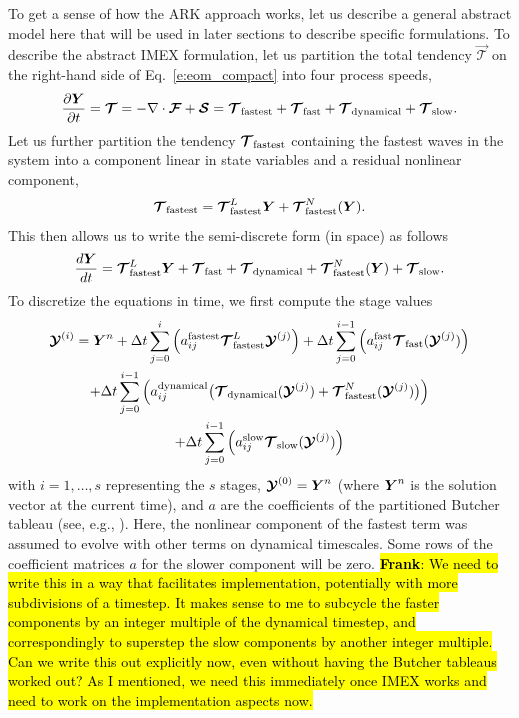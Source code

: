 \documentclass{article}
\begin{document}
{To get a sense of how the ARK approach works, let us describe a general abstract model here that will be used in later sections to describe specific formulations. To describe the abstract IMEX formulation, let us partition the total tendency $\vec{\mathcal{T}}$ on the right-hand side of Eq.~\eqref{e:eom_compact} into four process speeds,
\[
\frac{\partial \boldsymbol{{Y}}}{\partial t} = \boldsymbol{{\mathcal{T}}} = - \nabla \cdot \boldsymbol{{\mathcal{F}}} + \boldsymbol{{\mathcal{S}}} = \boldsymbol{{\mathcal{T}}}_{\mathrm{fastest}} + \boldsymbol{{\mathcal{T}}}_{\mathrm{fast}} + \boldsymbol{{\mathcal{T}}}_{\mathrm{dynamical}} + \boldsymbol{{\mathcal{T}}}_{\mathrm{slow}}.
\]
Let us further partition the tendency $\boldsymbol{{\mathcal{T}}}_\mathrm{fastest}$ containing the fastest waves in the system into a component linear in state variables and a residual nonlinear component,
\[
\boldsymbol{{\mathcal{T}}}_\mathrm{fastest} =  \boldsymbol{{\mathcal{T}}}^L_\mathrm{fastest} \boldsymbol{{Y}} + \boldsymbol{{\mathcal{T}}}^N_\mathrm{fastest}(\boldsymbol{{Y}}).
\]
This then allows us to write the semi-discrete form (in space) as follows
\begin{equation}\label{eq:IMEX}
\frac{d \boldsymbol{{Y}}}{d t} =  \boldsymbol{{\mathcal{T}}}^L_\mathrm{fastest} \boldsymbol{{Y}} + \boldsymbol{{\mathcal{T}}}_\mathrm{fast} + 
\boldsymbol{{\mathcal{T}}}_\mathrm{dynamical} + \boldsymbol{{\mathcal{T}}}^N_\mathrm{fastest}(\boldsymbol{{Y}}) + \boldsymbol{{\mathcal{T}}}_\mathrm{slow}.
\end{equation}
To discretize the equations in time, we first compute the stage values
\begin{multline}\label{eq:IMEX/stages}
\boldsymbol{{\mathcal{Y}}}^{(i)}= \boldsymbol{{Y}}^n + \Delta t \sum_{j=0}^{i} \left( a^{\mathrm{fastest}}_{ij} \boldsymbol{{\mathcal{T}}}_{\mathrm{fastest}}^L \boldsymbol{{\mathcal{Y}}}^{(j)} \right) + \Delta t \sum_{j=0}^{i-1} \left( {a}^{\mathrm{fast}}_{ij} \boldsymbol{{\mathcal{T}}}_{\mathrm{fast}}(\boldsymbol{{\mathcal{Y}}}^{(j)}) \right)  \\
+  \Delta t \sum_{j=0}^{i-1} \left( {a}^{\mathrm{dynamical}}_{ij} \bigl(\boldsymbol{{\mathcal{T}}}_{\mathrm{dynamical}}(\boldsymbol{{\mathcal{Y}}}^{(j)}) + \boldsymbol{{\mathcal{T}}}^N_\mathrm{fastest}(\boldsymbol{{\mathcal{Y}}}^{(j)})\bigr)\right) \\
+ \Delta t \sum_{j=0}^{i-1} \left( {a}^{\mathrm{slow}}_{ij} \boldsymbol{{\mathcal{T}}}_{\mathrm{slow}}(\boldsymbol{{\mathcal{Y}}}^{(j)}) \right)
\end{multline}
with $i=1,\ldots,s$ representing the $s$ stages, $\boldsymbol{{\mathcal{Y}}}^{(0)}=\boldsymbol{{Y}}^n$ (where $\boldsymbol{{Y}}^n$ is the solution vector at the current time), and $a$ are the coefficients of the partitioned Butcher tableau (see, e.g., \citet{constantinescu:2007, constantinescu:2007}). Here, the nonlinear component of the fastest term was assumed to evolve with other terms on dynamical timescales. Some rows of the coefficient matrices $a$ for the slower component will be zero. \hl{\textbf{Frank}: We need to write this in a way that facilitates implementation, potentially with more subdivisions of a timestep. It makes sense to me to subcycle the faster components by an integer multiple of the dynamical timestep, and correspondingly to superstep the slow components by another integer multiple. Can we write this out explicitly now, even without having the Butcher tableaus worked out? As I mentioned, we need this immediately once IMEX works and need to work on the implementation aspects now.} 
}
\end{document}

